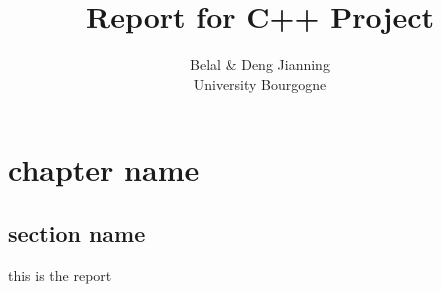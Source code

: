 \documentclass[english]{book}
\title{Report for C++ Project}
\begin{document}
\author{Belal \& Deng Jianning\\University Bourgogne}


\maketitle
\let\cleardoublepage\clearpage
\tableofcontents
\newpage
\chapter{chapter name}
\section{section name}


this is the report 
\end{document}

